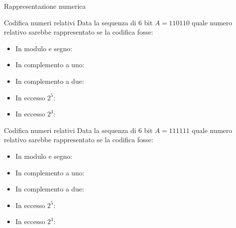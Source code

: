 \documentclass[11pt]{article}
\begin{document}
\begin{quiz}{Rappresentazione numerica}
\begin{cloze}[points=1,shuffle=false]{Codifica numeri relativi}
Data la sequenza di 6 bit $A = 110110$ quale numero relativo sarebbe rappresentato se la codifica fosse:
\begin{itemize}
\item In modulo e segno: 
\item In complemento a uno: 
\item In complemento a due: 
\item In eccesso $2^5$: 
\item In eccesso $2^3$: 
\end{itemize}
\end{cloze}

\begin{cloze}[points=1,shuffle=false]{Codifica numeri relativi}
Data la sequenza di 6 bit $A = 111111$ quale numero relativo sarebbe rappresentato se la codifica fosse:
\begin{itemize}
\item In modulo e segno: 
\item In complemento a uno: 
\item In complemento a due: 
\item In eccesso $2^5$: 
\item In eccesso $2^3$: 
\end{itemize}
\end{cloze}


\end{quiz}
\end{document}
